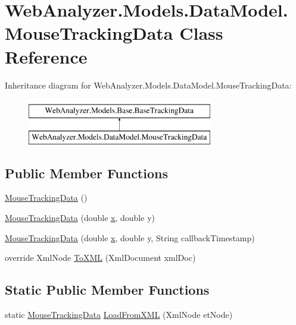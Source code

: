 \hypertarget{class_web_analyzer_1_1_models_1_1_data_model_1_1_mouse_tracking_data}{}\section{Web\+Analyzer.\+Models.\+Data\+Model.\+Mouse\+Tracking\+Data Class Reference}
\label{class_web_analyzer_1_1_models_1_1_data_model_1_1_mouse_tracking_data}
Inheritance diagram for Web\+Analyzer.\+Models.\+Data\+Model.\+Mouse\+Tracking\+Data\+:\begin{figure}[H]
\begin{center}
\leavevmode
\includegraphics[height=2.000000cm]{class_web_analyzer_1_1_models_1_1_data_model_1_1_mouse_tracking_data}
\end{center}
\end{figure}
\subsection*{Public Member Functions}
\begin{DoxyCompactItemize}
\item 
\hyperlink{class_web_analyzer_1_1_models_1_1_data_model_1_1_mouse_tracking_data_a38482ac54ba153ef229c8c6313462e08}{Mouse\+Tracking\+Data} ()
\item 
\hyperlink{class_web_analyzer_1_1_models_1_1_data_model_1_1_mouse_tracking_data_a49172e5d351b98a72488de19db61cb63}{Mouse\+Tracking\+Data} (double \hyperlink{_u_i_2_h_t_m_l_resources_2js_2lib_2underscore_8min_8js_a81e910173af87b1161e719a504d52407}{x}, double y)
\item 
\hyperlink{class_web_analyzer_1_1_models_1_1_data_model_1_1_mouse_tracking_data_a84d4d864926c20f1467500df28bed785}{Mouse\+Tracking\+Data} (double \hyperlink{_u_i_2_h_t_m_l_resources_2js_2lib_2underscore_8min_8js_a81e910173af87b1161e719a504d52407}{x}, double y, String callback\+Timestamp)
\item 
override Xml\+Node \hyperlink{class_web_analyzer_1_1_models_1_1_data_model_1_1_mouse_tracking_data_ac1af00e598088574f90d7431888af2e3}{To\+X\+M\+L} (Xml\+Document xml\+Doc)
\end{DoxyCompactItemize}
\subsection*{Static Public Member Functions}
\begin{DoxyCompactItemize}
\item 
static \hyperlink{class_web_analyzer_1_1_models_1_1_data_model_1_1_mouse_tracking_data}{Mouse\+Tracking\+Data} \hyperlink{class_web_analyzer_1_1_models_1_1_data_model_1_1_mouse_tracking_data_ab48b52dcbbb5ab0f1fb3e3e5c929f082}{Load\+From\+X\+M\+L} (Xml\+Node et\+Node)
\end{DoxyCompactItemize}
